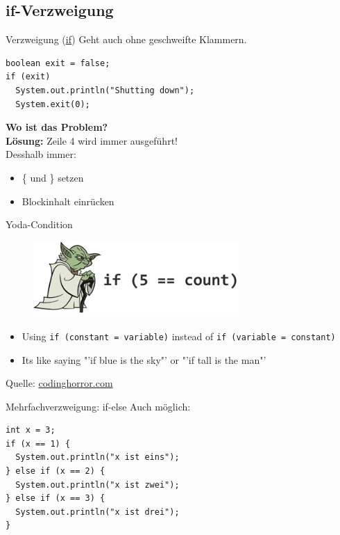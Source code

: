 \documentclass[18pt]{beamer}
\begin{document}
\subsection{if-Verzweigung}
\begin{frame}[fragile]{Verzweigung (\url{if})}
  Geht auch ohne geschweifte Klammern.
  \begin{lstlisting}
boolean exit = false;
if (exit)
  System.out.println("Shutting down");
  System.exit(0);
\end{lstlisting}
\textbf{Wo ist das Problem?}\\
\pause
\textbf{Lösung:} Zeile 4 wird immer ausgeführt!
\\
Desshalb immer:
\begin{itemize}
  \item \{ und \} setzen
  \item Blockinhalt einrücken
\end{itemize}
\end{frame}

\begin{frame}{Yoda-Condition}
  \begin{figure}
	\centering
  \includegraphics[width=0.7\textwidth]{yoda.png}
  \end{figure}
  \begin{itemize}
    \item Using \lstinline$if (constant = variable)$ instead of \lstinline$if (variable = constant)$
    \item Its like saying "'if blue is the sky"' or "'if tall is the man"'
  \end{itemize}
  Quelle: \href{http://www.codinghorror.com/blog/2012/07/new-programming-jargon.html}{codinghorror.com}
\end{frame}

\begin{frame}[fragile]{Mehrfachverzweigung: if-else}
  Auch möglich:
  \begin{lstlisting}
int x = 3;
if (x == 1) {
  System.out.println("x ist eins");
} else if (x == 2) {
  System.out.println("x ist zwei");
} else if (x == 3) {
  System.out.println("x ist drei");
}
  \end{lstlisting}
\end{frame}
\end{document}
